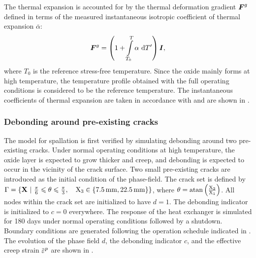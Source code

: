 The thermal expansion is accounted for by the thermal deformation gradient $\boldsymbol{F}^g$ defined in terms of the measured instantaneous isotropic coefficient of thermal expansion $\bar{\alpha}$:
\begin{align}
  \boldsymbol{F}^g = \left( 1 + \int\limits_{T_0}^T \alpha \text{ d}T' \right) \boldsymbol{I},
\end{align}
where $T_0$ is the reference stress-free temperature. Since the oxide mainly forms at high temperature, the temperature profile obtained with the full operating conditions is considered to be the reference temperature. The instantaneous coefficients of thermal expansion are taken in accordance with \cite{xue2020stress} and are shown in .



\subsubsection{Debonding around pre-existing cracks}
\label{section: Chapter5/examples/spallation/preexisting}

The model for spallation is first verified by simulating debonding around two pre-existing cracks. Under normal operating conditions at high temperature, the oxide layer is expected to grow thicker and creep, and debonding is expected to occur in the vicinity of the crack surface.
Two small pre-existing cracks are introduced as the initial condition of the phase-field. The crack set is defined by $\Gamma = \{ \textbf{X} \ \vert\ \frac{\pi}{6} \leqslant \theta \leqslant \frac{\pi}{3}, \quad \text{X}_3 \in \{ \SI{7.5}{\milli\meter}, \SI{22.5}{\milli\meter} \} \}$, where $\theta = \operatorname{atan}\left( \frac{\text{X}_2}{\text{X}_1} \right)$.
All nodes within the crack set are initialized to have $d = 1$. The debonding indicator is initialized to $c = 0$ everywhere.
The response of the heat exchanger is simulated for 180 days under normal operating conditions followed by a shutdown.
Boundary conditions are generated following the operation schedule indicated in .
The evolution of the phase field $d$, the debonding indicator $c$, and the effective creep strain $\ep$ are shown in .

